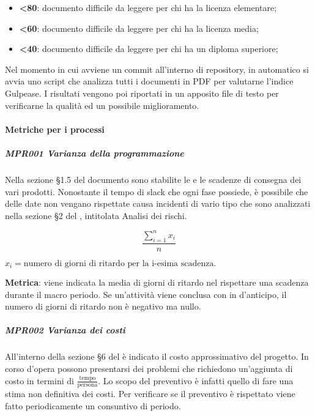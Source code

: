 				\begin{itemize}
					\item \textbf{<80}: documento  difficile da leggere per chi ha la licenza elementare;
					\item \textbf{<60}: documento  difficile da leggere per chi ha la licenza media;
					\item \textbf{<40}: documento difficile da leggere per chi ha un diploma superiore;
				\end{itemize}

				Nel momento in cui avviene un commit all'interno di repository, in automatico si avvia uno script che analizza tutti i documenti in PDF per valutarne l'indice Gulpease. I risultati vengono poi riportati in un apposito file di testo per verificarne la qualità ed un possibile miglioramento.

%

			\paragraph{Metriche per i processi}
				\subparagraph{MPR001 Varianza della programmazione}
				Nella sezione \S 1.5 del documento \Doc{\PdPv} sono stabilite le  e le scadenze di consegna dei vari prodotti.
				Nonostante il tempo di slack che ogni fase possiede, è possibile che delle date non vengano rispettate causa incidenti di vario tipo che sono
				analizzati nella sezione \S 2 del \Doc{\PdPv}, intitolata Analisi dei rischi.

				\[\dfrac{\sum_{i=1}^{n} x_i}{n}\]
				
				$x_i=\text{numero di giorni di ritardo per la i-esima scadenza.}$

				\textbf{Metrica}: viene indicata la media di giorni di ritardo nel rispettare una scadenza durante il macro periodo. Se un'attività viene conclusa con in d'anticipo, il numero di giorni di ritardo non è negativo ma nullo.
				
				\subparagraph{MPR002 Varianza dei costi}
				All'interno della sezione \S 6 del \Doc{\PdPv} è indicato il costo approssimativo del progetto.
				In corso d'opera possono presentarsi dei problemi che richiedono un'aggiunta di costo in termini di $\frac{\text{tempo}}{\text{persona}}$.
				Lo scopo del preventivo è infatti quello di fare una stima non definitiva dei costi. Per verificare se il preventivo è rispettato viene fatto periodicamente un consuntivo di periodo.

